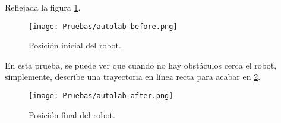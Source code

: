 \documentclass[a4paper, 11pt]{article}
\begin{document}
		Reflejada la figura \ref{begin-a}.
		
		\begin{figure}[H]
			\centering
			\texttt{[image: Pruebas/autolab-before.png]}
			\caption{Posición inicial del robot.}
			\label{begin-a}	
		\end{figure}
		
		En esta prueba, se puede ver que cuando no hay obstáculos cerca el robot, simplemente, describe
		una trayectoria en línea recta para acabar en \ref{end-a}.		
		
		\begin{figure}[H]
			\centering
			\texttt{[image: Pruebas/autolab-after.png]}
			\caption{Posición final del robot.}
			\label{end-a}	
		\end{figure}
\end{document}

